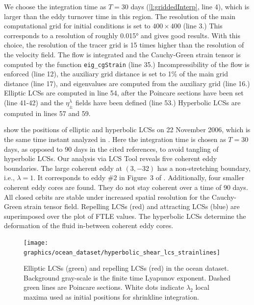 \documentclass{article}
\begin{document}
We choose the integration time as $T=30$ days (\cref{l:griddedInterp}, line 4), which is larger than the eddy turnover time in this region. The resolution of the main computational grid for initial conditions is set to $400 \times 400$ (line 3.) This corresponds to a resolution of roughly 0.015° and gives good results. With this choice, the resolution of the tracer grid is 15 times higher than the resolution of the velocity field. The flow is integrated and the Cauchy-Green strain tensor is computed by the function \lstinline!eig_cgStrain! (line 35.) Incompressibility of the flow is enforced (line 12), the auxiliary grid distance is set to 1\% of the main grid distance (line 17), and eigenvalues are computed from the auxiliary grid (line 16.) Elliptic LCSs are computed in line 54, after the Poincare sections have been set (line 41-42) and the $\eta_\pm^\lambda$ fields have been defined (line 53.) Hyperbolic LCSs are computed in lines 57 and 59.

 show the positions of elliptic and hyperbolic LCSs on 22 November 2006, which is the same time instant analyzed in \textcite{haller13:_coher_lagran,beron-vera13:_objec_agulh}. Here the integration time is chosen as $T = 30$ days, as opposed to 90 days in the cited references, to avoid tangling of hyperbolic LCSs. Our analysis via LCS Tool reveals five coherent eddy boundaries. The large coherent eddy at $(3,-32)$ has a non-stretching boundary, i.e., $\lambda = 1$. It corresponds to eddy \#2 in Figure~3 of \textcite{beron-vera13:_objec_agulh}. Additionally, four smaller coherent eddy cores are found. They do not stay coherent over a time of 90 days. All closed orbits are stable under increased spatial resolution for the Cauchy-Green strain tensor field. Repelling LCSs (red) and attracting LCSs (blue) are superimposed over the plot of FTLE values. The hyperbolic LCSs determine the deformation of the fluid in-between coherent eddy cores.

\begin{figure}
\begin{center}
\texttt{[image: graphics/ocean\_dataset/hyperbolic\_shear\_lcs\_strainlines]}
\end{center}
\caption{Elliptic LCSs (green) and repelling LCSs (red) in the ocean dataset. Background gray-scale is the finite time Lyapunov exponent. Dashed green lines are Poincare sections. White dots indicate $\lambda_2$ local maxima used as initial positions for shrinkline integration.}
\label{f:ocean dataset hyperbolic shear lcs details strainline}
\end{figure}
\end{document}
